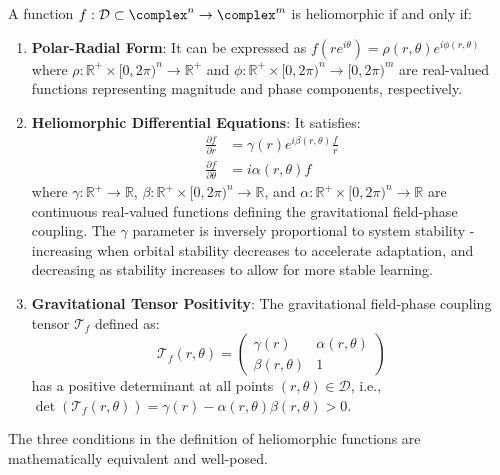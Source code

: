 \begin{definition}
A function $f: \mathcal{D} \subset \complex^n \rightarrow \complex^m$ is heliomorphic if and only if:
\begin{enumerate}
    \item \textbf{Polar-Radial Form}: It can be expressed as $f(re^{i\theta}) = \rho(r,\theta)e^{i\phi(r,\theta)}$ where $\rho: \mathbb{R}^+ \times [0,2\pi)^n \rightarrow \mathbb{R}^+$ and $\phi: \mathbb{R}^+ \times [0,2\pi)^n \rightarrow [0,2\pi)^m$ are real-valued functions representing magnitude and phase components, respectively.
    
    \item \textbf{Heliomorphic Differential Equations}: It satisfies:
    \begin{align}
        \frac{\partial f}{\partial r} &= \gamma(r)e^{i\beta(r,\theta)}\frac{f}{r}\\
        \frac{\partial f}{\partial \theta} &= i\alpha(r,\theta)f
    \end{align}
    where $\gamma: \mathbb{R}^+ \rightarrow \mathbb{R}$, $\beta: \mathbb{R}^+ \times [0,2\pi)^n \rightarrow \mathbb{R}$, and $\alpha: \mathbb{R}^+ \times [0,2\pi)^n \rightarrow \mathbb{R}$ are continuous real-valued functions defining the gravitational field-phase coupling. The $\gamma$ parameter is inversely proportional to system stability - increasing when orbital stability decreases to accelerate adaptation, and decreasing as stability increases to allow for more stable learning.
    
    \item \textbf{Gravitational Tensor Positivity}: The gravitational field-phase coupling tensor $\mathcal{T}_f$ defined as:
    \begin{equation}
        \mathcal{T}_f(r,\theta) = \begin{pmatrix}
            \gamma(r) & \alpha(r,\theta)\\
            \beta(r,\theta) & 1
        \end{pmatrix}
    \end{equation}
    has a positive determinant at all points $(r,\theta) \in \mathcal{D}$, i.e., $\det(\mathcal{T}_f(r,\theta)) = \gamma(r) - \alpha(r,\theta)\beta(r,\theta) > 0$.
\end{enumerate}
\end{definition}

\begin{theorem}
\label{thm:heliomorphic_equivalence}
The three conditions in the definition of heliomorphic functions are mathematically equivalent and well-posed.
\end{theorem}


